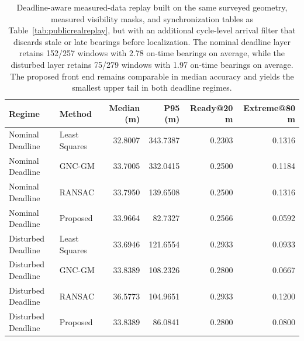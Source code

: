 \begin{table}[!htbp]
\centering
\caption{Deadline-aware measured-data replay built on the same surveyed geometry, measured visibility masks, and synchronization tables as Table~\ref{tab:publicrealreplay}, but with an additional cycle-level arrival filter that discards stale or late bearings before localization. The nominal deadline layer retains 152/257 windows with 2.78 on-time bearings on average, while the disturbed layer retains 75/279 windows with 1.97 on-time bearings on average. The proposed front end remains comparable in median accuracy and yields the smallest upper tail in both deadline regimes.}
\label{tab:deadlinereplay}
\begingroup
\setlength{\tabcolsep}{4pt}
\small
\begin{tabular}{@{}llrrrr@{}}
\toprule
Regime & Method & Median (m) & P95 (m) & Ready@20 m & Extreme@80 m \\
\midrule
Nominal Deadline   & Least Squares & 32.8007 & 343.7387 & 0.2303 & 0.1316 \\
Nominal Deadline   & GNC-GM        & 33.7005 & 332.0415 & 0.2500 & 0.1184 \\
Nominal Deadline   & RANSAC        & 33.7950 & 139.6508 & 0.2500 & 0.1316 \\
Nominal Deadline   & Proposed      & 33.9664 &  82.7327 & 0.2566 & 0.0592 \\
\midrule
Disturbed Deadline & Least Squares & 33.6946 & 121.6554 & 0.2933 & 0.0933 \\
Disturbed Deadline & GNC-GM        & 33.8389 & 108.2326 & 0.2800 & 0.0667 \\
Disturbed Deadline & RANSAC        & 36.5773 & 104.9651 & 0.2933 & 0.1200 \\
Disturbed Deadline & Proposed      & 33.8389 &  86.0841 & 0.2800 & 0.0800 \\
\bottomrule
\end{tabular}
\endgroup
\end{table}
